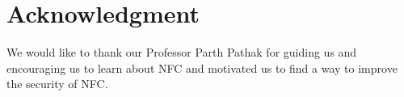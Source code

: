 \documentclass[conference]{IEEEtran}
\begin{document}


\section*{Acknowledgment}


We would like to thank our Professor Parth Pathak for guiding us and encouraging us to learn about NFC and motivated us to find a way to improve the security of NFC. 





\end{document}
